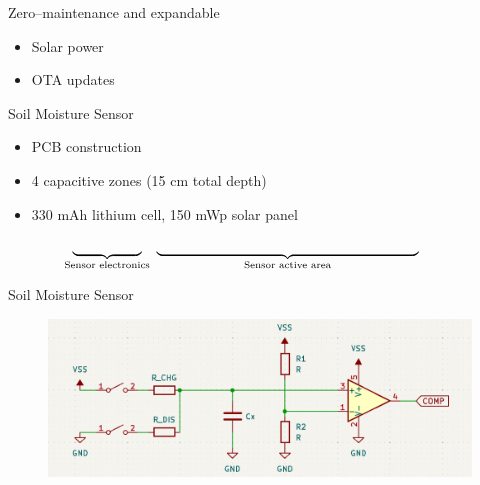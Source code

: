 \documentclass{beamer}
\begin{document}
\begin{frame}{Zero--maintenance and expandable}
\begin{itemize}
    \item Solar power
    \item OTA updates
\end{itemize}
\end{frame}

\begin{frame}{Soil Moisture Sensor}
\begin{itemize}
    \item PCB construction
    \item 4 capacitive zones (15 cm total depth)
    \item 330 mAh lithium cell, 150 mWp solar panel
\end{itemize}
\begin{figure}
    \centering
    
\end{figure}
$$\underbrace{\text{\hspace{5em}}}_{\text{Sensor electronics}}~\underbrace{\text{\hspace{19em}}}_{\text{Sensor active area}}\text{\hspace{2.5em}}$$
\end{frame}


\begin{frame}{Soil Moisture Sensor}
\begin{figure}
    \centering
    \includegraphics[width=\linewidth]{../thesis/fig/principle-cap-measure.png}
\end{figure}
\end{frame}
\end{document}
